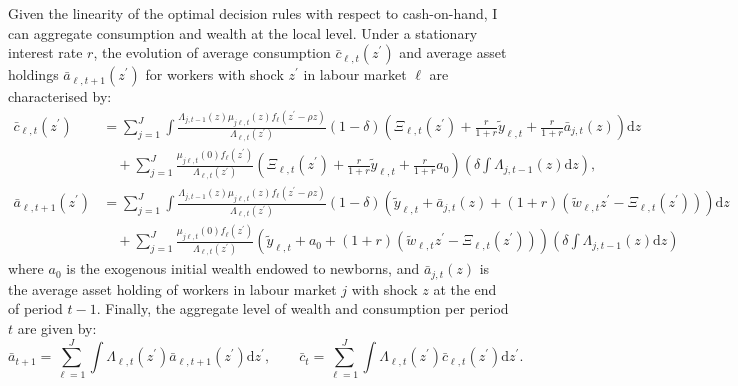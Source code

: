 \documentclass[11pt, a4paper]{article}
\begin{document}
Given the linearity of the optimal decision rules with respect to cash-on-hand, I can aggregate consumption and wealth at the local level. Under a stationary interest rate $r$, the evolution of average consumption $\bar{c}_{\ell,t}(z^\prime)$ and average asset holdings $\bar{a}_{\ell,t+1}(z^\prime)$ for workers with shock $z^\prime$ in labour market $\ell$ are characterised by:
\begin{align}
\bar{c}_{\ell,t}(z^\prime) &= \sum_{j=1}^J \int \frac{\Lambda_{j,t-1}(z)\mu_{j\ell,t}(z)f_\ell(z^\prime - \rho z)}{\Lambda_{\ell,t}(z^\prime)} (1-\delta) \left( \Xi_{\ell,t}(z^\prime) + \frac{r}{1+r} \tilde{y}_{\ell,t} + \frac{r}{1+r} \bar{a}_{j,t}(z) \right) \mathrm{d}z \nonumber \\
&\quad + \sum_{j=1}^J \frac{\mu_{j\ell,t}(0) f_\ell(z^\prime)}{\Lambda_{\ell,t}(z^\prime)} \left( \Xi_{\ell,t}(z^\prime) + \frac{r}{1+r} \tilde{y}_{\ell,t} + \frac{r}{1+r} a_0 \right) \left( \delta \int \Lambda_{j,t-1}(z) \mathrm{d}z \right), \\
\bar{a}_{\ell,t+1}(z^\prime) &= \sum_{j=1}^J \int \frac{\Lambda_{j,t-1}(z)\mu_{j\ell,t}(z)f_\ell(z^\prime - \rho z)}{\Lambda_{\ell,t}(z^\prime)} (1-\delta) \left( \tilde{y}_{\ell,t} + \bar{a}_{j,t}(z) + (1+r)(\tilde{w}_{\ell,t}z^\prime - \Xi_{\ell,t}(z^\prime)) \right) \mathrm{d}z \nonumber \\
&\quad + \sum_{j=1}^J \frac{\mu_{j\ell,t}(0) f_\ell(z^\prime)}{\Lambda_{\ell,t}(z^\prime)} \left( \tilde{y}_{\ell,t} + a_0 + (1+r)(\tilde{w}_{\ell,t}z^\prime - \Xi_{\ell,t}(z^\prime)) \right) \left( \delta \int \Lambda_{j,t-1}(z) \mathrm{d}z \right)
\end{align}
where $a_0$ is the exogenous initial wealth endowed to newborns, and $\bar{a}_{j,t}(z)$ is the average asset holding of workers in labour market $j$ with shock $z$ at the end of period $t-1$. Finally, the aggregate level of wealth and consumption per period $t$ are given by:
\begin{equation}
  \bar{a}_{t+1} = \sum_{\ell=1}^J \int \Lambda_{\ell,t}(z^\prime) \bar{a}_{\ell,t+1}(z^\prime) \mathrm{d}z^\prime, \qquad
  \bar{c}_{t} = \sum_{\ell=1}^J \int \Lambda_{\ell,t}(z^\prime) \bar{c}_{\ell,t}(z^\prime) \mathrm{d}z^\prime.
\end{equation}
\end{document}
